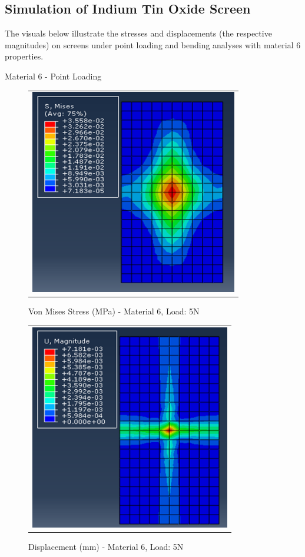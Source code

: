 \documentclass[a4paper,12pt]{article}
\numberwithin{equation}{section}
\numberwithin{figure}{section}
\begin{document}
\subsection{Simulation of Indium Tin Oxide Screen}

\noindent The visuals below illustrate the stresses and displacements (the respective magnitudes) on screens under point loading and bending analyses with material 6 properties. \vspace{\baselineskip}

\noindent Material 6 - Point Loading 
\begin{figure}[H]
  \centering
  \begin{tabular}{@{}c@{}}
    \includegraphics[width=0.7\linewidth,height=255pt]{Results/Point Loading/M6_VMS_L1_new.png} \\
  \end{tabular}
  \caption{Von Mises Stress (MPa) - Material 6, Load: 5N}
\end{figure}

\begin{figure}[H]
  \centering
  \begin{tabular}{@{}c@{}}
    \includegraphics[width=0.7\linewidth,height=255pt]{Results/Point Loading/M6_DIS_L1_new.png} \\
  \end{tabular}
  \caption{Displacement (mm) - Material 6, Load: 5N}
\end{figure}
\end{document}
